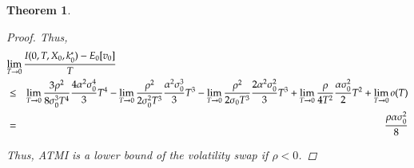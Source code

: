\documentclass[11pt]{article}
\newtheorem{theorem}{Theorem}
\begin{document}
\begin{theorem}
\begin{proof}
Thus,
\begin{eqnarray}
\lefteqn{\lim_{T\rightarrow 0}\frac{I( 0,T,X_0,k_0^*) -E_{0}[v_{0}]} {T}}\nonumber \\
&\le& 
\lim_{T\rightarrow 0}\frac{3\rho^{2}}{8\sigma _{0}^{3}T^{4}} \frac{4 \alpha^2 \sigma_0^4}{3}T^4
- \lim_{T\rightarrow 0}\frac{\rho ^{2}}{{2\sigma _{0}^2T^{3}}}\frac{\alpha^2 \sigma_0^3}{3}T^3
- \lim_{T\rightarrow 0}\frac{\rho ^{2}}{2\sigma _{0}T^{3}} \frac{2 \alpha^2\sigma_0^2}{3}T^3
+ \lim_{T\rightarrow 0}\frac{\rho}{4T^{2}} \frac{\alpha \sigma_0^2}{2}T^2 + \lim_{T\to 0}o(T)\nonumber\\
&=& \frac{\rho \alpha \sigma_0^2}{8}
\end{eqnarray}

Thus, ATMI is a lower bound of the volatility swap if $\rho<0$.
\end{proof}
\end{theorem}
\end{document}
